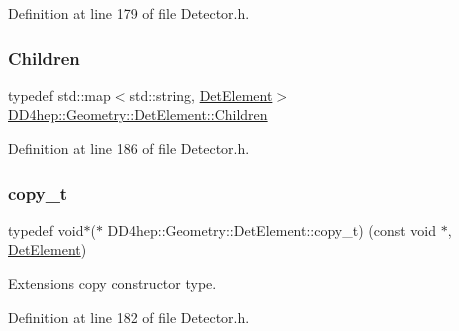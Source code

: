 Definition at line 179 of file Detector.\+h.

\hypertarget{class_d_d4hep_1_1_geometry_1_1_det_element_afc41f63ac2a467f5077d1cca1292d580}{}\label{class_d_d4hep_1_1_geometry_1_1_det_element_afc41f63ac2a467f5077d1cca1292d580} 
\subsubsection{\texorpdfstring{Children}{Children}}
{\footnotesize\ttfamily typedef std\+::map$<$std\+::string, \hyperlink{class_d_d4hep_1_1_geometry_1_1_det_element}{Det\+Element}$>$ \hyperlink{class_d_d4hep_1_1_geometry_1_1_det_element_afc41f63ac2a467f5077d1cca1292d580}{D\+D4hep\+::\+Geometry\+::\+Det\+Element\+::\+Children}}



Definition at line 186 of file Detector.\+h.

\hypertarget{class_d_d4hep_1_1_geometry_1_1_det_element_a5eca2ca4ab2049faab552a0ad3f616a1}{}\label{class_d_d4hep_1_1_geometry_1_1_det_element_a5eca2ca4ab2049faab552a0ad3f616a1} 
\subsubsection{\texorpdfstring{copy\+\_\+t}{copy\_t}}
{\footnotesize\ttfamily typedef void$\ast$($\ast$ D\+D4hep\+::\+Geometry\+::\+Det\+Element\+::copy\+\_\+t) (const void $\ast$, \hyperlink{class_d_d4hep_1_1_geometry_1_1_det_element}{Det\+Element})}



Extensions copy constructor type. 



Definition at line 182 of file Detector.\+h.

\hypertarget{class_d_d4hep_1_1_geometry_1_1_det_element_a3fb2233645917aa646b957308fc750cf}{}\label{class_d_d4hep_1_1_geometry_1_1_det_element_a3fb2233645917aa646b957308fc750cf} 
